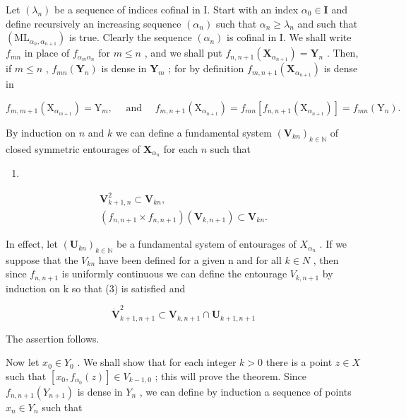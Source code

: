 Let \((\lambda_{n})\) be a sequence of indices cofinal in I. Start with an index \(\alpha_0 \in \mathbf{I}\) and define recursively an increasing sequence \((\alpha_{n})\) such that \(\alpha_{n} \geqslant \lambda_{n}\) and such that \((\mathrm{ML}_{\alpha_{n}, \alpha_{n+1}})\) is true. Clearly the sequence \((\alpha_{n})\) is cofinal in I. We shall write \(f_{mn}\) in place of \(f_{\alpha_m\alpha_n}\) for \(m \leqslant n\) , and we shall put \(f_{n,n+1}(\mathbf{X}_{\alpha_{n+1}}) = \mathbf{Y}_n\) . Then, if \(m \leqslant n\) , \(f_{mn}(\mathbf{Y}_n)\) is dense in \(\mathbf{Y}_m\) ; for by definition \(f_{m,n+1}(\mathbf{X}_{\alpha_{n+1}})\) is dense in

\[
f _ {m, m + 1} \left(\mathrm{X} _ {\alpha_ {m + 1}}\right) = \mathrm{Y} _ {m}, \quad \text { and } \quad f _ {m, n + 1} \left(\mathrm{X} _ {\alpha_ {n + 1}}\right) = f _ {m n} \left[ f _ {n, n + 1} \left(\mathrm{X} _ {\alpha_ {n + 1}}\right) \right] = f _ {m n} \left(\mathrm{Y} _ {n}\right).
\]

By induction on \(n\) and \(k\) we can define a fundamental system \((\mathbf{V}_{kn})_{k\in \mathbb{N}}\) of closed symmetric entourages of \(\mathbf{X}_{\alpha_n}\) for each \(n\) such that

\begin{enumerate}
\def\labelenumi{(\arabic{enumi})}
\setcounter{enumi}{1}
\tightlist
\item
\end{enumerate}

\[
\begin{array}{c} \mathbf {V} _ {k + 1, n} ^ {2} \subset \mathbf {V} _ {k n}, \\ (f _ {n, n + 1} \times f _ {n, n + 1}) (\mathbf {V} _ {k, n + 1}) \subset \mathbf {V} _ {k n}. \end{array}\tag{3}
\]

In effect, let \((\mathbf{U}_{kn})_{k\in\mathbb{N}}\) be a fundamental system of entourages of \(X_{\alpha_{n}}\) . If we suppose that the \(V_{kn}\) have been defined for a given n and for all \(k\in N\) , then since \(f_{n,n+1}\) is uniformly continuous we can define the entourage \(V_{k,n+1}\) by induction on k so that (3) is satisfied and

\[
\mathbf {\dot {V}} _ {k + 1, n + 1} ^ {2} \subset \mathbf {V} _ {k, n + 1} \cap \mathbf {U} _ {k + 1, n + 1}
\]

The assertion follows.

Now let \(x_0 \in Y_0\) . We shall show that for each integer \(k > 0\) there is a point \(z \in X\) such that \([x_0, f_{\alpha_0}(z)] \in V_{k-1,0}\) ; this will prove the theorem. Since \(f_{n,n+1}(Y_{n+1})\) is dense in \(Y_n\) , we can define by induction a sequence of points \(x_n \in Y_n\) such that

